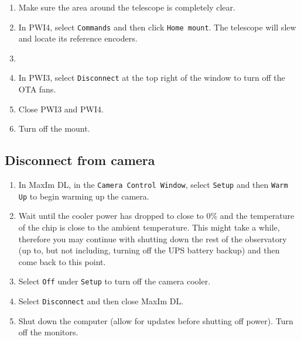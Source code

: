 \documentclass{article}
\begin{document}
		\begin{enumerate}

			\item Make sure the area around the telescope is completely clear.

			\item In PWI4, select \texttt{Commands} and then click \texttt{Home mount}. The telescope will slew and locate its reference encoders.

			\item

			\item In PWI3, select \texttt{Disconnect} at the top right of the window to turn off the OTA fans.

			\item Close PWI3 and PWI4.

			\item Turn off the mount.

		\end{enumerate}

	\subsection{Disconnect from camera}

		\begin{enumerate}

			\item In MaxIm DL, in the \texttt{Camera Control Window}, select \texttt{Setup} and then \texttt{Warm Up} to begin warming up the camera.

			\item Wait until the cooler power has dropped to close to 0\% and the temperature of the chip is close to the ambient temperature. This might take a while, therefore you may continue with shutting down the rest of the observatory (up to, but not including, turning off the UPS battery backup) and then come back to this point.

			\item Select \texttt{Off} under \texttt{Setup} to turn off the camera cooler.

			\item Select \texttt{Disconnect} and then close MaxIm DL.

			\item Shut down the computer (allow for updates before shutting off power). Turn off the monitors.

		\end{enumerate}
\end{document}
